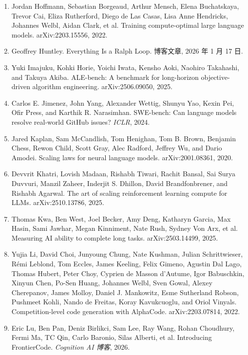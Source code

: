 \begin{enumerate}
\item Jordan Hoffmann, Sebastian Borgeaud, Arthur Mensch, Elena Buchatskaya, Trevor Cai, Eliza Rutherford, Diego de Las Casas, Lisa Anne Hendricks, Johannes Welbl, Aidan Clark, et al. Training compute-optimal large language models. arXiv:2203.15556, 2022.

\item Geoffrey Huntley. Everything Is a Ralph Loop. 博客文章, 2026 年 1 月 17 日.

\item Yuki Imajuku, Kohki Horie, Yoichi Iwata, Kensho Aoki, Naohiro Takahashi, and Takuya Akiba. ALE-bench: A benchmark for long-horizon objective-driven algorithm engineering. arXiv:2506.09050, 2025.

\item Carlos E. Jimenez, John Yang, Alexander Wettig, Shunyu Yao, Kexin Pei, Ofir Press, and Karthik R. Narasimhan. SWE-bench: Can language models resolve real-world GitHub issues? \textit{ICLR}, 2024.

\item Jared Kaplan, Sam McCandlish, Tom Henighan, Tom B. Brown, Benjamin Chess, Rewon Child, Scott Gray, Alec Radford, Jeffrey Wu, and Dario Amodei. Scaling laws for neural language models. arXiv:2001.08361, 2020.

\item Devvrit Khatri, Lovish Madaan, Rishabh Tiwari, Rachit Bansal, Sai Surya Duvvuri, Manzil Zaheer, Inderjit S. Dhillon, David Brandfonbrener, and Rishabh Agarwal. The art of scaling reinforcement learning compute for LLMs. arXiv:2510.13786, 2025.

\item Thomas Kwa, Ben West, Joel Becker, Amy Deng, Katharyn Garcia, Max Hasin, Sami Jawhar, Megan Kinniment, Nate Rush, Sydney Von Arx, et al. Measuring AI ability to complete long tasks. arXiv:2503.14499, 2025.

\item Yujia Li, David Choi, Junyoung Chung, Nate Kushman, Julian Schrittwieser, R\'emi Leblond, Tom Eccles, James Keeling, Felix Gimeno, Agustin Dal Lago, Thomas Hubert, Peter Choy, Cyprien de Masson d'Autume, Igor Babuschkin, Xinyun Chen, Po-Sen Huang, Johannes Welbl, Sven Gowal, Alexey Cherepanov, James Molloy, Daniel J. Mankowitz, Esme Sutherland Robson, Pushmeet Kohli, Nando de Freitas, Koray Kavukcuoglu, and Oriol Vinyals. Competition-level code generation with AlphaCode. arXiv:2203.07814, 2022.

\item Eric Lu, Ben Pan, Deniz Birlikci, Sam Lee, Ray Wang, Rohan Choudhury, Fermi Ma, TC Qin, Carlo Baronio, Silas Alberti, et al. Introducing FrontierCode. \textit{Cognition AI 博客}, 2026.


\end{enumerate}
